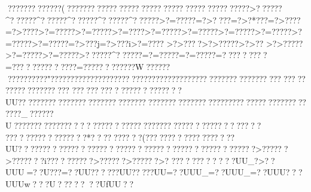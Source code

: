 {{{{{{{{{{{{{{{{{{{{{{{{{{{{{{{{{{{{{{{{{{{{{{{{{{{{{{{{{{{{{{{{{{{{{{{{{{{{{{{{{{{{{{{{{{{{{{{{{{{{{{{{{{{{{{{{{{{{{{{{{{{{{{{{{{{{{{{{{{{{{{{{{{{{{{{{{{{{{{{{{{{{{{{{{{{{{{{{{{{{{{{{{{{{{{{{{{{{{{{{{{{{{{{{{{{{{{{{{{{{{{{{{{{{{{{{{{{{{{{{{{{{{{{{{{{{{{{{{{{{{{{{{{{{{{{{{{{{{{{{{{{{{{{{{{{{{{{{{{{{{{{{{{{{{{{{{{{{{{{{{{{{{{{{{{{{{{{{{{{{{{{{{{{{{{{{{{{{{{{{{{{{{{{{{{{{{{{{{{{{{{{{{{{{{{{{{{{{{{{{{{{{{{{{{{{{{{{{{{{{{{{{{{{{{{{{{{{{{{{{{{{{{{{{{{{{{{{{{{{{{{{{{{{{{{{{{{{{{{{{{{{{{{{{{{{{{{{{{{{{{{{{{{{{{{{{{{{{{{{{{{{{{{{{{{{{{{{{{{{{{{{{{{{{{{{{{{{{{{{{{{{{{{{{{{{{{{{{{{{{{{{{{{{{{{{{{{{{{{{{{{{{{{{{{{{{{{{{{{{{{{{{{{{{{{{{{{{{{{{{{{{{{{{{{{{{{{{{{{{{{{{{{{{{{{{{{{{{{{{{{{{{{{{{{{{{{{{{{{{{{{{{{{{{{{{{{{{{{{{{{{{{{{{{{{{{{{{{{{{{{{{{{{{{{{{{{{{{{{{{{{{{{{{{{{{{{{{{{{{{{{{{{{{{{{{{{{{{{{{{{{{{{{{{{{{{{{{{{{{{{{{{{{{{{{{{{{{{{{{{{{{{{{{{{{{{{{{{{{{{{{{{{{{{{{{{{{{{{{{{{{{{{{{{{{{{{{{{{{{{{{{{{{{{{{{{{{{{{{{{{{{{{{{{{{{{{{{{{{{{{{{{{{{{{{{{{{{{{{{{{{{{{{{{{{{{{{{{{{{{{{{{{{{{{{{{{{{{{{{{{{{{{{{{{{{{{{{{{{{{{{{{{{{{{{{{{{{{{{{{{{{{{{{{{{{{{{{{{{{{{{{{{{{{{{{{{{{{{{{{{{{{{{{{{{{{{{{{{{{{{{{{{{{{{{{{{{{{{{{{{{{{{{{{{{{{{{{{{{{{{{{{{{{{{{{{{{{{{{{{{{{{{{{{{{{{{{{{{{{{{{{{{{{{{{{{{{{{{{{{{{{{{{{{{{{{{{{{{{{{{{{{{{{{{{{{{{{{{{{{{{{{{{{{{{{{{{{{{{{{{{{{{{{{{{{{{{{{{{{{{{{{{{{{{{{{{{{{{{{{{{{{{{?????????????(????????????  ?????  ?????  ?????  ?????  ?????  ?????  >??????^??????^??????^??????^??????^??????>?=?????=?>????=?>?*???=?>????=?>????>?=?????>?=?????>?=????>?=?????>?=?????>?=?????>?=?????>?=?????>?=?????=?>???j=?>???i>?=????
>?>????>?>?????>?>??
>?>?????>?=?????>?=?????>??????^??????=?=?????=?=?????=?????????=??????????????=????????????W??????????  ?????? "?????? ??????? ???????????????????????????????????????????????????????????????
???????????????????????UU???????????????????????????????????????????????????????????????????????_??????U????????????????    ??????????????????????  ??????????????? ?????????????????  *???   ????   ???(??????   ??? ??????   ????UU??????????????????????????????????????????????????>??????>???????i??????????>??????>??????>?
?????  ????  ???UU_?>??UUU=??U???=??UU??????UU?????UU=??UUU_=??UUU_=??UUU???UUUw?? ?U???   ??   ??UfUU?? }}}}}}}}}}}}}}}}}}}}}}}}}}}}}}}}}}}}}}}}}}}}}}}}}}}}}}}}}}}}}}}}}}}}}}}}}}}}}}}}}}}}}}}}}}}}}}}}}}}}}}}}}}}}}}}}}}}}}}}}}}}}}}}}}}}}}}}}}}}}}}}}}}}}}}}}}}}}}}}}}}}}}}}}}}}}}}}}}}}}}}}}}}}}}}}}}}}}}}}}}}}}}}}}}}}}}}}}}}}}}}}}}}}}}}}}}}}}}}}}}}}}}}}}}}}}}}}}}}}}}}}}}}}}}}}}}}}}}}}}}}}}}}}}}}}}}}}}}}}}}}}}}}}}}}}}}}}}}}}}}}}}}}}}}}}}}}}}}}}}}}}}}}}}}}}}}}}}}}}}}}}}}}}}}}}}}}}}}}}}}}}}}}}}}}}}}}}}}}}}}}}}}}}}}}}}}}}}}}}}}}}}}}}}}}}}}}}}}}}}}}}}}}}}}}}}}}}}}}}}}}}}}}}}}}}}}}}}}}}}}}}}}}}}}}}}}}}}}}}}}}}}}}}}}}}}}}}}}}}}}}}}}}}}}}}}}}}}}}}}}}}}}}}}}}}}}}}}}}}}}}}}}}}}}}}}}}}}}}}}}}}}}}}}}}}}}}}}}}}}}}}}}}}}}}}}}}}}}}}}}}}}}}}}}}}}}}}}}}}}}}}}}}}}}}}}}}}}}}}}}}}}}}}}}}}}}}}}}}}}}}}}}}}}}}}}}}}}}}}}}}}}}}}}}}}}}}}}}}}}}}}}}}}}}}}}}}}}}}}}}}}}}}}}}}}}}}}}}}}}}}}}}}}}}}}}}}}}}}}}}}}}}}}}}}}}}}}}}}}}}}}}}}}}}}}}}}}}}}}}}}}}}}}}}}}}}}}}}}}}}}}}}}}}}}}}}}}}}}}}}}}}}}}}}}}}}}}}}}}}}}}}}}}}}}}}}}}}}}}}}}}}}}}}}}}}}}}}}}}}}}}}}}}}}}}}}}}}}}}}}}}}}}}}}}}}}}}}}}}}}}}}}}}}}}}}}}}}}}}}}}}}}}}}}}}}}}}}}}}}}}}}}}}}}}}}}}}}}}}}}}}}}}}}}}}}}}}}}}}}}}}}}}}}}}}}}}}}}}}}}}}}}}}}}}}}}}}}}}}}}}}}}}}}}}}}}}}}}}}}}}}}}}}}}}}}}}}}}}}}}}}}}}}}}}}}}}}}}}}}}}}}}}}}}}}}}}}}}}}}}}}}}}}}}}}}}}}}}}}}}}}}}}}}}}}}}}}}}}}}}}}}}}}}}}}}}}}}}}}}}}}}}}}}}}}}}}}}}}}}}}}}}}}}}}}}}}}}}}}}}}}}}}}}}}}}}}}}}}}}}}}}}}}}}}}}}}}}}}}}}}}}}}
